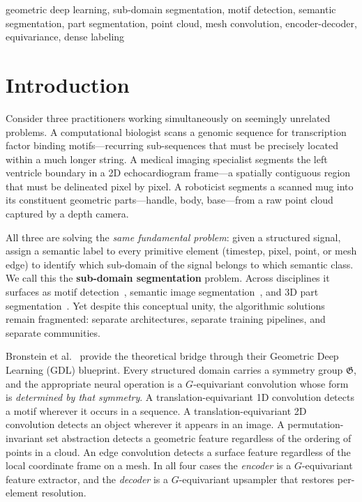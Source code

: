 \documentclass[10pt,conference]{IEEEtran}
\newcommand{\fG}{\mathfrak{G}}
\begin{document}
\begin{IEEEkeywords}
geometric deep learning, sub-domain segmentation, motif detection,
semantic segmentation, part segmentation, point cloud, mesh convolution,
encoder-decoder, equivariance, dense labeling
\end{IEEEkeywords}

\section{Introduction}
\label{sec:intro}

Consider three practitioners working simultaneously on seemingly unrelated
problems.  A computational biologist scans a genomic sequence for
transcription factor binding motifs---recurring sub-sequences that must be
precisely located within a much longer string.  A medical imaging specialist
segments the left ventricle boundary in a 2D echocardiogram frame---a
spatially contiguous region that must be delineated pixel by pixel.  A
roboticist segments a scanned mug into its constituent geometric
parts---handle, body, base---from a raw point cloud captured by a depth
camera.

All three are solving the \emph{same fundamental problem}: given a
structured signal, assign a semantic label to every primitive element
(timestep, pixel, point, or mesh edge) to identify which sub-domain of
the signal belongs to which semantic class.  We call this the
\textbf{sub-domain segmentation} problem.  Across disciplines it surfaces
as motif detection~\cite{bagnall2017great}, semantic image
segmentation~\cite{ronneberger2015unet,lin2017fpn}, and 3D part
segmentation~\cite{qi2017pointnetplusplus,hanocka2019meshcnn}.  Yet
despite this conceptual unity, the algorithmic solutions remain
fragmented: separate architectures, separate training pipelines, and
separate communities.

Bronstein et al.~\cite{bronstein2021geometric} provide the theoretical
bridge through their Geometric Deep Learning (GDL) blueprint.  Every
structured domain carries a symmetry group $\fG$, and the appropriate
neural operation is a $G$-equivariant convolution whose form is
\emph{determined by that symmetry}.  A translation-equivariant 1D
convolution detects a motif wherever it occurs in a sequence.  A
translation-equivariant 2D convolution detects an object wherever it
appears in an image.  A permutation-invariant set abstraction detects a
geometric feature regardless of the ordering of points in a cloud.  An
edge convolution detects a surface feature regardless of the local
coordinate frame on a mesh.  In all four cases the \emph{encoder} is a
$G$-equivariant feature extractor, and the \emph{decoder} is a
$G$-equivariant upsampler that restores per-element resolution.
\end{document}
